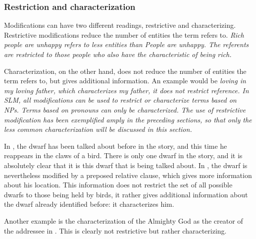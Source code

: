 \subsubsection{Restriction and characterization}\label{sec:func:Restrictionandcharacterization}
Modifications can have two different readings, restrictive and characterizing. Restrictive modifications reduce the number of entities the term refers to. \em Rich people are unhappy \em refers to less entities than \em People are unhappy\em. The referents are restricted to those people who also have the characteristic of being rich.

Characterization, on the other hand, does not reduce the number of entities the term refers to, but gives additional information. An example would be  \em loving \em in \em my loving father\em, which characterizes my father, it does not restrict reference.
In SLM, all modifications can be used to restrict or characterize terms based on NPs. Terms based on pronouns can only be characterized. The use of restrictive modification has been exemplified amply in the preceding sections, so that only the less common characterization will be discussed in this section.

In , the dwarf has been talked about before in the story, and this time he reappears in the claws of a bird. There is only one dwarf in the story, and it is absolutely clear that it is this dwarf that is being talked about. In , the dwarf is nevertheless modified by  a preposed relative clause, which gives more information about his location. This information does not restrict the set of all possible dwarfs to those being held by birds, it rather gives additional information about the dwarf already identified before: it characterizes him.



Another example is the characterization of the Almighty God as the creator of the addressee in . This is clearly not restrictive but rather characterizing.



